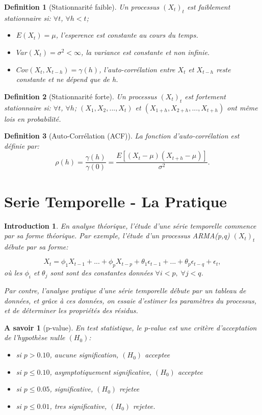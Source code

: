 \documentclass{article}
\newtheorem*{asavoir}{A savoir}
\newtheorem{intro}{Introduction}[section]
\newtheorem{definition}{Definition}[section]
\begin{document}
\begin{definition}[Stationnarité faible]
Un processus $(X_t)_t$ est faiblement stationnaire si: $\forall t$, $\forall h<t$;
\begin{itemize}
\item $E(X_t)=\mu$, l'esperence est constante au cours du temps.
\item $Var(X_t)=\sigma^2<\infty$, la variance est constante et non infinie.
\item $Cov(X_t,X_{t-h})=\gamma(h)$, l'auto-corrélation entre $X_t$ et $X_{t-h}$ reste constante et ne dépend que de h.
\end{itemize}
\end{definition}

\begin{definition}[Stationnarité forte]
Un processus $(X_t)_t$ est fortement stationnaire si: $\forall t$, $\forall h$; $(X_1,X_2,...,X_t)$ et $(X_{1+h},X_{2+h},...,X_{t+h})$ ont même lois en probabilité.
\end{definition}

\begin{definition}[Auto-Corrélation (ACF)]
La fonction d'auto-corrélation est définie par:
$$\rho(h)=\frac{\gamma(h)}{\gamma(0)}=\frac{E[(X_t-\mu)(X_{t+h}-\mu)]}{\sigma^2}.$$


\end{definition}

\newpage

\section{Serie Temporelle - La Pratique}

\begin{intro}
En analyse théorique, l'étude d'une série temporelle commence par sa forme théorique. Par exemple, l'étude d'un processus ARMA(p,q) $(X_t)_t$ débute par sa forme:

$$X_t=\phi_1{X_{t-1}}+...+\phi_p{X_{t-p}}+\theta_1{\epsilon_{t-1}}+...+\theta_p{\epsilon_{t-q}}+\epsilon_t,$$
où les $\phi_i$ et $\theta_j$ sont sont des constantes données $\forall i<p, \; \forall j<q$.
\newline

Par contre, l'analyse pratique d'une série temporelle débute par un tableau de données, et grâce à ces données, on essaie d'estimer les paramètres du processus, et de déterminer les propriétés des résidus.

\end{intro}
\begin{asavoir}[p-value]
En test statistique, le p-value est une critère d'acceptation de l'hypothèse nulle $(H_0)$:
\begin{itemize}
\item si $p>0.10$, aucune signification, $(H_0)$ acceptee
\item si $p\leq0.10$, asymptotiquement significative, $(H_0)$ acceptee
\item si $p\leq0.05$, significative, $(H_0)$ rejetee
\item si $p\leq0.01$, tres significative, $(H_0)$ rejetee.
\end{itemize}
\end{asavoir}
\end{document}
